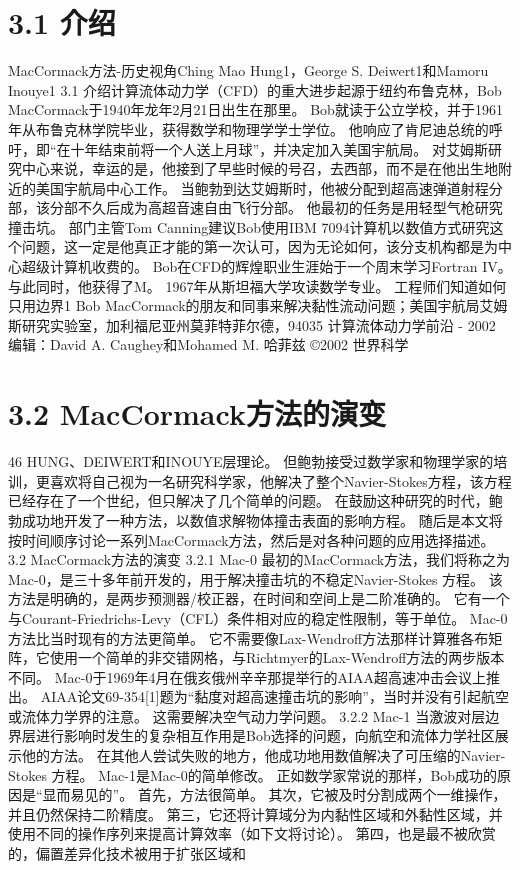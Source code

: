 \documentclass[UTF8,11pt,a4paper,openany,fontset=fandol]{ctexbook}
\begin{document}
\section{3.1 介绍}
MacCormack方法-历史视角Ching Mao Hung1，George S. Deiwert1和Mamoru Inouye1 3.1 介绍计算流体动力学（CFD）的重大进步起源于纽约布鲁克林，Bob MacCormack于1940年龙年2月21日出生在那里。 Bob就读于公立学校，并于1961年从布鲁克林学院毕业，获得数学和物理学学士学位。 他响应了肯尼迪总统的呼吁，即“在十年结束前将一个人送上月球”，并决定加入美国宇航局。 对艾姆斯研究中心来说，幸运的是，他接到了早些时候的号召，去西部，而不是在他出生地附近的美国宇航局中心工作。 当鲍勃到达艾姆斯时，他被分配到超高速弹道射程分部，该分部不久后成为高超音速自由飞行分部。 他最初的任务是用轻型气枪研究撞击坑。 部门主管Tom Canning建议Bob使用IBM 7094计算机以数值方式研究这个问题，这一定是他真正才能的第一次认可，因为无论如何，该分支机构都是为中心超级计算机收费的。 Bob在CFD的辉煌职业生涯始于一个周末学习Fortran IV。 与此同时，他获得了M。 1967年从斯坦福大学攻读数学专业。 工程师们知道如何只用边界1 Bob MacCormack的朋友和同事来解决黏性流动问题；美国宇航局艾姆斯研究实验室，加利福尼亚州莫菲特菲尔德，94035 计算流体动力学前沿 - 2002 编辑：David A. Caughey和Mohamed M. 哈菲兹 ©2002 世界科学

\section{3.2 MacCormack方法的演变}
46 HUNG、DEIWERT和INOUYE层理论。 但鲍勃接受过数学家和物理学家的培训，更喜欢将自己视为一名研究科学家，他解决了整个Navier-Stokes方程，该方程已经存在了一个世纪，但只解决了几个简单的问题。 在鼓励这种研究的时代，鲍勃成功地开发了一种方法，以数值求解物体撞击表面的影响方程。 随后是本文将按时间顺序讨论一系列MacCormack方法，然后是对各种问题的应用选择描述。 3.2 MacCormack方法的演变 3.2.1 Mac-0 最初的MacCormack方法，我们将称之为Mac-0，是三十多年前开发的，用于解决撞击坑的不稳定Navier-Stokes 方程。 该方法是明确的，是两步预测器/校正器，在时间和空间上是二阶准确的。 它有一个与Courant-Friedrichs-Levy（CFL）条件相对应的稳定性限制，等于单位。 Mac-0方法比当时现有的方法更简单。 它不需要像Lax-Wendroff方法那样计算雅各布矩阵，它使用一个简单的非交错网格，与Richtmyer的Lax-Wendroff方法的两步版本不同。 Mac-0于1969年4月在俄亥俄州辛辛那提举行的AIAA超高速冲击会议上推出。 AIAA论文69-354[1]题为“黏度对超高速撞击坑的影响”，当时并没有引起航空或流体力学界的注意。 这需要解决空气动力学问题。 3.2.2 Mac-1 当激波对层边界层进行影响时发生的复杂相互作用是Bob选择的问题，向航空和流体力学社区展示他的方法。 在其他人尝试失败的地方，他成功地用数值解决了可压缩的Navier-Stokes 方程。 Mac-1是Mac-0的简单修改。 正如数学家常说的那样，Bob成功的原因是“显而易见的”。 首先，方法很简单。 其次，它被及时分割成两个一维操作，并且仍然保持二阶精度。 第三，它还将计算域分为内黏性区域和外黏性区域，并使用不同的操作序列来提高计算效率（如下文将讨论）。 第四，也是最不被欣赏的，偏置差异化技术被用于扩张区域和
\end{document}
